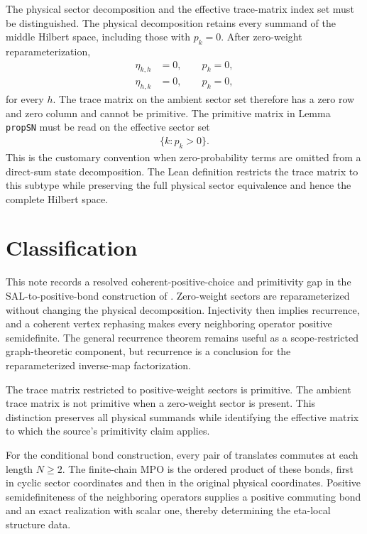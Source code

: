 \documentclass{article}
\begin{document}
The physical sector decomposition and the effective trace-matrix index set
must be distinguished. The physical decomposition retains every summand of the
middle Hilbert space, including those with $p_k=0$. After zero-weight
reparameterization,
\begin{align}
    \eta_{k,h}
        &=0,
        \qquad p_k=0,
    \label{eq:cpgsv17_mpdo_sal_zcl_eta_local_structure_inactive_outgoing_eta_zero}\\
    \eta_{h,k}
        &=0,
        \qquad p_k=0,
    \label{eq:cpgsv17_mpdo_sal_zcl_eta_local_structure_inactive_incoming_eta_zero}
\end{align}
for every $h$. The trace matrix on the ambient sector set therefore has a zero
row and zero column and cannot be primitive. The primitive matrix in Lemma
\texttt{propSN} must be read on the effective sector set
\begin{align}
    \{k:p_k>0\}.
    \label{eq:cpgsv17_mpdo_sal_zcl_eta_local_structure_active_sector_set}
\end{align}
This is the customary convention when zero-probability terms are omitted from
a direct-sum state decomposition. The Lean definition
 restricts the
trace matrix to this subtype while preserving the full physical sector
equivalence and hence the complete Hilbert space.

\section{Classification}

This note records a resolved coherent-positive-choice and primitivity gap in
the SAL-to-positive-bond construction of
. Zero-weight sectors are
reparameterized without changing the physical decomposition. Injectivity then
implies recurrence, and a coherent vertex rephasing makes every neighboring
operator positive semidefinite. The general recurrence theorem remains useful
as a scope-restricted graph-theoretic component, but recurrence is a conclusion
for the reparameterized inverse-map factorization.

The trace matrix restricted to positive-weight sectors is primitive. The
ambient trace matrix is not primitive when a zero-weight sector is present.
This distinction preserves all physical summands while identifying the
effective matrix to which the source's primitivity claim applies.

For the conditional bond construction, every pair of translates commutes at
each length $N\geq 2$. The finite-chain MPO is the ordered product of these
bonds, first in cyclic sector coordinates and then in the original physical
coordinates. Positive semidefiniteness of the neighboring operators supplies a
positive commuting bond and an exact realization with scalar one, thereby
determining the eta-local structure data.
\end{document}
